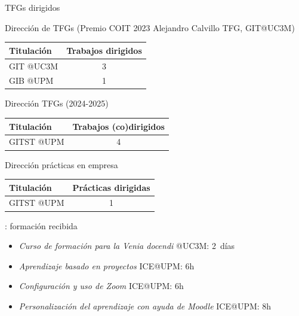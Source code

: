 \documentclass[xcolor=table,xcolor=x11names]{beamer}
\begin{document}
\begin{frame}{\secname}{TFGs dirigidos}

    Dirección de TFGs
    ({Premio COIT 2023 Alejandro Calvillo TFG, GIT@UC3M})
    \begin{table}
        \tiny
        \centering
        \begin{tabular}{l | c}
            \toprule
            \textbf{Titulación} & \textbf{Trabajos dirigidos} \\ \midrule
            GIT @UC3M & 3\\
            GIB @UPM & 1\\
            \bottomrule
        \end{tabular}
    \end{table}


    \vfill

    Dirección TFGs (2024-2025)
    \begin{table}
        \tiny
        \centering
        \begin{tabular}{l | c}
            \toprule
            \textbf{Titulación} & \textbf{Trabajos (co)dirigidos } \\ \midrule
            GITST @UPM & 4\\
            \bottomrule
        \end{tabular}
    \end{table}

    \vfill

    Dirección prácticas en empresa
    \begin{table}
        \tiny
        \centering
        \begin{tabular}{l | c}
            \toprule
            \textbf{Titulación} & \textbf{Prácticas dirigidas} \\ \midrule
            GITST @UPM & 1\\ %
            \bottomrule
        \end{tabular}
    \end{table}

\end{frame}




\begin{frame}{\secname: formación recibida}
    \begin{itemize}
        \item \emph{Curso de formación para la Venia docendi} @UC3M: 2~días
        \item \emph{Aprendizaje basado en proyectos} ICE@UPM: 6h
        \item \emph{Configuración y uso de Zoom} ICE@UPM: 6h
        \item \emph{Personalización del aprendizaje con ayuda de Moodle} ICE@UPM: 8h
    \end{itemize}
\end{frame}
\end{document}
